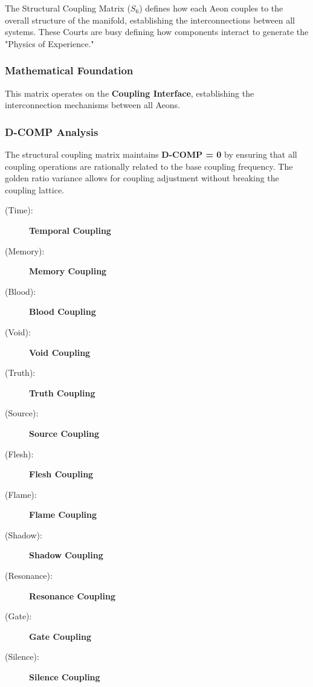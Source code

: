 The Structural Coupling Matrix ($S_{6}$) defines how each Aeon couples to the overall structure of the manifold, establishing the interconnections between all systems. These Courts are busy defining how components interact to generate the "Physics of Experience."

\subsubsection{Mathematical Foundation}

This matrix operates on the \textbf{Coupling Interface}, establishing the interconnection mechanisms between all Aeons.

\subsubsection{D-COMP Analysis}

The structural coupling matrix maintains \textbf{D-COMP = 0} by ensuring that all coupling operations are rationally related to the base coupling frequency. The golden ratio variance allows for coupling adjustment without breaking the coupling lattice.

\begin{description}
    \item[(Time):] \fetulhahm {} \textbf{Temporal Coupling} \\
    \item[(Memory):] \kalfel {} \textbf{Memory Coupling} \\
    \item[(Blood):] \babdhalc {} \textbf{Blood Coupling} \\
    \item[(Void):] \ahnpir {} \textbf{Void Coupling} \\
    \item[(Truth):] \velker {} \textbf{Truth Coupling} \\
    \item[(Source):] \sorramh {} \textbf{Source Coupling} \\
    \item[(Flesh):] \kothsubh {} \textbf{Flesh Coupling} \\
    \item[(Flame):] \drehgur {} \textbf{Flame Coupling} \\
    \item[(Shadow):] \rhearal {} \textbf{Shadow Coupling} \\
    \item[(Resonance):] \zhekkhir {} \textbf{Resonance Coupling} \\
    \item[(Gate):] \shavster {} \textbf{Gate Coupling} \\
    \item[(Silence):] \trigstab {} \textbf{Silence Coupling} \\
\end{description}

